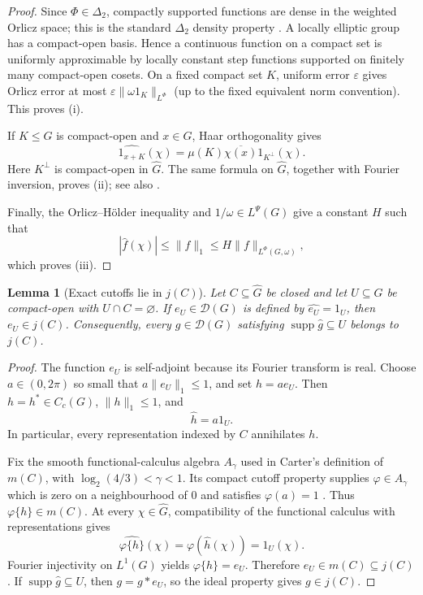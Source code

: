 \documentclass[11pt]{article}
\newtheorem{lemma}[theorem]{Lemma}
\newcommand{\D}{\mathcal D}
\newcommand{\wideG}{\widehat G}
\begin{document}
\begin{proof}
Since $\Phi\in\Delta_2$, compactly supported functions are dense in the
weighted Orlicz space; this is the standard $\Delta_2$ density property
\cite{RaoRen}.  A locally elliptic group has a compact-open basis.  Hence a
continuous function on a compact set is uniformly approximable by locally
constant step functions supported on finitely many compact-open cosets.  On a
fixed compact set $K$, uniform error $\varepsilon$ gives Orlicz error at most
$\varepsilon\|\omega 1_K\|_{L^\Phi}$ (up to the fixed equivalent norm
convention).  This proves (i).

If $K\leq G$ is compact-open and $x\in G$, Haar orthogonality gives
\[
 \widehat{1_{x+K}}(\chi)
   =\mu(K)\overline{\chi(x)}1_{K^\perp}(\chi).
\]
Here $K^\perp$ is compact-open in $\wideG$.  The same formula on $\wideG$,
together with Fourier inversion, proves (ii); see also \cite{Rudin}.

Finally, the Orlicz--H\"older inequality and $1/\omega\in L^\Psi(G)$ give a
constant $H$ such that
\[
 |\widehat f(\chi)|\leq\|f\|_1
 \leq H\|f\|_{L^\Phi(G,\omega)},
\]
which proves (iii).
\end{proof}

\begin{lemma}[Exact cutoffs lie in $j(C)$]\label{lem:cutoff}
Let $C\subseteq\wideG$ be closed and let $U\subseteq\wideG$ be compact-open
with $U\cap C=\varnothing$.  If $e_U\in\D(G)$ is defined by
$\widehat{e_U}=1_U$, then $e_U\in j(C)$.  Consequently, every
$g\in\D(G)$ satisfying $\operatorname{supp}\widehat g\subseteq U$ belongs to
$j(C)$.
\end{lemma}

\begin{proof}
The function $e_U$ is self-adjoint because its Fourier transform is real.
Choose $a\in(0,2\pi)$ so small that $a\|e_U\|_1\leq1$, and set
$h=ae_U$.  Then $h=h^*\in C_c(G)$, $\|h\|_1\leq1$, and
\[
 \widehat h=a1_U.
\]
In particular, every representation indexed by $C$ annihilates $h$.

Fix the smooth functional-calculus algebra $A_\gamma$ used in Carter's
definition of $m(C)$, with $\log_2(4/3)<\gamma<1$.  Its compact cutoff
property supplies $\varphi\in A_\gamma$ which is zero on a neighbourhood of
$0$ and satisfies $\varphi(a)=1$ \cite[Proposition 5.5]{Carter}.  Thus
$\varphi\{h\}\in m(C)$.  At every $\chi\in\wideG$, compatibility of the
functional calculus with representations gives
\[
 \widehat{\varphi\{h\}}(\chi)
 =\varphi(\widehat h(\chi))
 =1_U(\chi).
\]
Fourier injectivity on $L^1(G)$ yields $\varphi\{h\}=e_U$.  Therefore
$e_U\in m(C)\subseteq j(C)$.  If
$\operatorname{supp}\widehat g\subseteq U$, then $g=g*e_U$, so the ideal
property gives $g\in j(C)$.
\end{proof}
\end{document}
